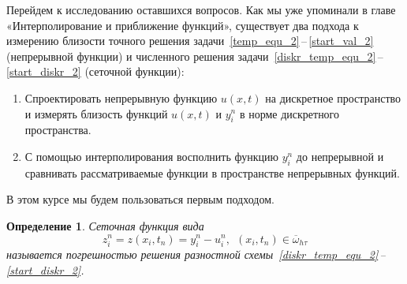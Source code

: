 \documentclass[11pt,a4paper,twoside]{report}
\numberwithin{equation}{section}
\newtheorem*{definition}{Определение}
\theoremstyle{definition}
\theoremstyle{plain}
\begin{document}
Перейдем к исследованию оставшихся вопросов. Как мы уже упоминали в главе «Интерполирование и приближение функций»,
существует два подхода к измерению близости точного решения
задачи~\eqref{temp_equ_2}\,--\,\eqref{start_val_2} (непрерывной функции) и
численного решения задачи~\eqref{diskr_temp_equ_2}\,--\,\eqref{start_diskr_2}
(сеточной функции):
%
\begin{enumerate}
%
    \item
    Спроектировать непрерывную функцию $u(x,t)$ на дискретное пространство
    и измерять близость функций $u(x,t)$ и $y_i^n$ в норме дискретного пространства.
    \item
    С помощью интерполирования восполнить функцию $y_i^n$ до непрерывной
    и сравнивать рассматриваемые функции в пространстве непрерывных функций.
%
\end{enumerate}
%
В этом курсе мы будем пользоваться первым подходом.

\begin{definition}
%
    Сеточная функция вида
    \begin{equation}
        \label{approx_temp}
        z_i^n=z(x_i, t_n)=y_i^n-u_i^n,~~(x_i, t_n) \in \overline{\omega}_{h\tau}
    \end{equation}
    называется погрешностью решения разностной схемы~\eqref{diskr_temp_equ_2}\,--\,\eqref{start_diskr_2}.
\end{definition}
%
\end{document}
